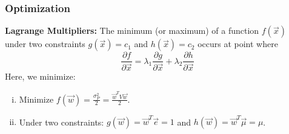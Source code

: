 \subsubsection{Optimization}
\textbf{Lagrange Multipliers: } The minimum (or maximum) of a function \(f(\vec{x})\) under two constraints \(g(\vec{x}) = c_1\) and \(h(\vec{x}) = c_2\) occurs at point where
\begin{equation*}
    \frac{\partial f}{\partial \vec{x}} = \lambda_1 \frac{\partial g}{\partial \vec{x}} + \lambda_2 \frac{\partial h}{\partial \vec{x}}
\end{equation*}
Here, we minimize:
\begin{enumerate}[i.]
    \item Minimize \(f(\vec{w}) = \frac{\sigma_P^2}{2} = \frac{\vec{w}^TV\vec{w}}{2}\).
    \item Under two constraints: \(g(\vec{w}) = \vec{w}^T\vec{e} = 1\) and \(h(\vec{w}) = \vec{w}^T\vec{\mu} = \mu\).
\end{enumerate}

